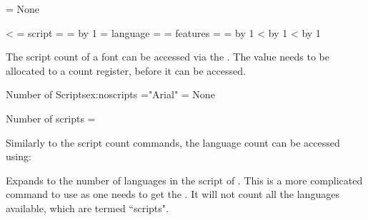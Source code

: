 \newcount\scriptcount
\newcount\scriptindex
\newcount\scripttag
\newcount\langcount
\newcount\langindex
\newcount\langtag
\newcount\featurecount
\newcount\featureindex
\newcount\featuretag

\nobreak\bigskip

\scriptcount=\XeTeXOTcountscripts\testfont
\ifnum{} \noindent None\par\fi

\loop
 \ifnum\scriptindex<\scriptcount
  \scripttag=\XeTeXOTscripttag\testfont\scriptindex
  \noindent script = \fourcharcode{\scripttag}\endgraf\nobreak
  \langcount=\XeTeXOTcountlanguages\testfont\scripttag
  \advance\langcount by 1 
  {\loop
    \langtag=\XeTeXOTlanguagetag\testfont\scripttag\langindex
    \indent language = \fourcharcode{\langtag}\endgraf\nobreak
    \featurecount=\XeTeXOTcountfeatures\testfont\scripttag\langtag
    {\indent\indent {}\parindent {} features = \loop
      \featuretag=\XeTeXOTfeaturetag\testfont\scripttag\langtag\featureindex
      \fourcharcode{\featuretag}
      \advance\featureindex by 1
      \ifnum\featureindex<\featurecount \repeat\endgraf}
    \advance\langindex by 1
  \ifnum\langindex<\langcount \medskip \repeat}
  \advance\scriptindex by 1
  \bigskip \repeat




\CMDI{\XeTeXOTcountscripts}

The script count of a font can be accessed via the . The value needs to
be allocated to a count register, before it can be accessed.

\begin{texexample}{Number of Scripts}{ex:noscripts}
\font\testfont="Arial" 
\scriptcount=\XeTeXOTcountscripts\testfont
\ifnum{} \noindent None\par\fi

Number of scripts = \the\scriptcount
\end{texexample}

Similarly to the script count commands, the language count can be accessed using:

\CMDI{\XeTeXOTcountlanguages}

Expands to the number of languages in the script of . This is a more complicated command to use as one needs to get the . It will not count all the languages available, which are termed ``scripts".


